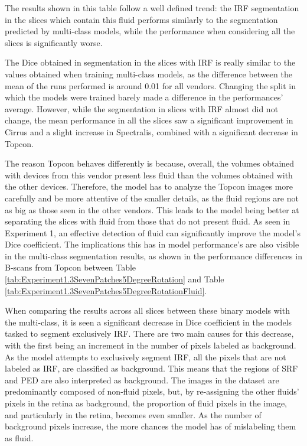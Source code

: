 The results shown in this table follow a well defined trend: the IRF segmentation in the slices which contain this fluid performs similarly to the segmentation predicted by multi-class models, while the performance when considering all the slices is significantly worse.
\par
The Dice obtained in segmentation in the slices with IRF is really similar to the values obtained when training multi-class models, as the difference between the mean of the runs performed is around 0.01 for all vendors. Changing the split in which the models were trained barely made a difference in the performances' average. However, while the segmentation in slices with IRF almost did not change, the mean performance in all the slices saw a significant improvement in Cirrus and a slight increase in Spectralis, combined with a significant decrease in Topcon. 
\par
The reason Topcon behaves differently is because, overall, the volumes obtained with devices from this vendor present less fluid than the volumes obtained with the other devices. Therefore, the model has to analyze the Topcon images more carefully and be more attentive of the smaller details, as the fluid regions are not as big as those seen in the other vendors. This leads to the model being better at separating the slices with fluid from those that do not present fluid. As seen in Experiment 1, an effective detection of fluid can significantly improve the model's Dice coefficient. The implications this has in model performance's are also visible in the multi-class segmentation results, as shown in the performance differences in B-scans from Topcon between Table \ref{tab:Experiment1.3SevenPatches5DegreeRotation} and Table \ref{tab:Experiment1.3SevenPatches5DegreeRotationFluid}.
\par
When comparing the results across all slices between these binary models with the multi-class, it is seen a significant decrease in Dice coefficient in the models tasked to segment exclusively IRF. There are two main causes for this decrease, with the first being an increment in the number of pixels labeled as background. As the model attempts to exclusively segment IRF, all the pixels that are not labeled as IRF, are classified as background. This means that the regions of SRF and PED are also interpreted as background. The images in the dataset are predominantly composed of non-fluid pixels, but, by re-assigning the other fluids' pixels in the retina as background, the proportion of fluid pixels in the image, and particularly in the retina, becomes even smaller. As the number of background pixels increase, the more chances the model has of mislabeling them as fluid.
